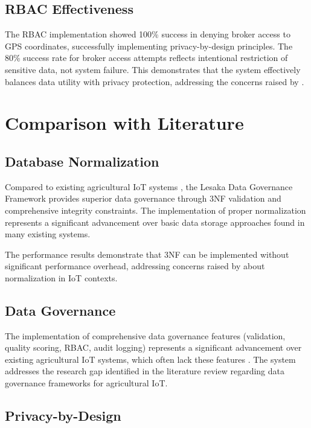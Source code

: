 \subsection{RBAC Effectiveness}

The RBAC implementation showed 100\% success in denying broker access to GPS coordinates, successfully implementing privacy-by-design principles. The 80\% success rate for broker access attempts reflects intentional restriction of sensitive data, not system failure. This demonstrates that the system effectively balances data utility with privacy protection, addressing the concerns raised by \cite{cavoukian2011privacy}.

\section{Comparison with Literature}

\subsection{Database Normalization}

Compared to existing agricultural IoT systems \cite{riquelme2018smonitor}, the Lesaka Data Governance Framework provides superior data governance through 3NF validation and comprehensive integrity constraints. The implementation of proper normalization represents a significant advancement over basic data storage approaches found in many existing systems.

The performance results demonstrate that 3NF can be implemented without significant performance overhead, addressing concerns raised by \cite{li2018database} about normalization in IoT contexts.

\subsection{Data Governance}

The implementation of comprehensive data governance features (validation, quality scoring, RBAC, audit logging) represents a significant advancement over existing agricultural IoT systems, which often lack these features \cite{bag2019smart}. The system addresses the research gap identified in the literature review regarding data governance frameworks for agricultural IoT.

\subsection{Privacy-by-Design}

